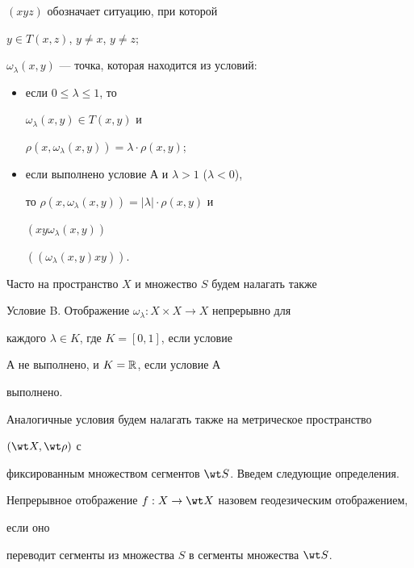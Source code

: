 \noindent $(xyz)$ обозначает ситуацию, при которой 


$y\in T(x,z)$, $y\ne x$, $y\ne z$; 


 


\noindent $\omega_{\lambda}(x,y)$ --- точка, которая находится из условий: 


\begin{itemize} 


\item[а)] если $0\le\lambda\le 1$, то 


$\omega_{\lambda}(x,y)\in T(x,y)$ и 


$\rho(x,\omega_{\lambda}(x,y))=\lambda\cdot\rho(x,y)$; 


\item[б)] если выполнено условие А и $\lambda>1$ ($\lambda<0$), 


то $\rho(x,\omega_{\lambda}(x,y))=|\lambda|\cdot\rho(x,y)$ и 


$(xy\omega_{\lambda}(x,y))$ 




$((\omega_{\lambda}(x,y)xy))$. 


\end{itemize}


 


Часто на пространство $X$ и множество $S$ будем налагать также 


 


Условие B. Отображение $\omega_{\lambda}:X\times X\to X$ непрерывно для 


каждого $\lambda\in K$, где $K=[0,1]$, если условие 


А не выполнено, и $K=\Bbb R$, если условие А 


выполнено. 


 


Аналогичные условия будем налагать также на метрическое пространство 


$(\wt X,\wt\rho)$ с 


фиксированным множеством сегментов $\wt S$. Введем следующие определения. 


Непрерывное отображение $f:X\to\wt X$ назовем геодезическим отображением, 


если оно 


переводит сегменты из множества $S$ в сегменты множества $\wt S$. 


